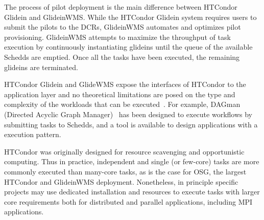 \documentclass{sig-alternate}
\begin{document}
The process of pilot deployment is the main difference between HTCondor Glidein
and GlideinWMS. While the HTCondor Glidein system requires users to submit the
pilots to the DCRs, GlideinWMS automates and optimizes pilot provisioning.
GlideinWMS attempts to maximize the throughput of task execution by continuously
instantiating glideins until the queue of the available Schedds are emptied.
Once all the tasks have been executed, the remaining glideins are terminated.


HTCondor Glidein and GlideWMS expose the interfaces of HTCondor to the
application layer and no theoretical limitations are posed on the type and
complexity of the workloads that can be executed~\cite{couvares2007workflow}.
For example, DAGman (Directed Acyclic Graph Manager)~\cite{frey2002condor} has
been designed to execute workflows by submitting tasks to Schedds, and a \MW
tool is available to design applications with a \MW execution pattern.



HTCondor was originally designed for resource scavenging and opportunistic
computing.  Thus in practice, independent and single (or few-core) tasks are
more commonly executed than many-core tasks, as is the case for OSG, the largest
HTCondor and GlideinWMS deployment. Nonetheless, in principle specific projects
may use dedicated installation and resources to execute tasks with larger core
requirements both for distributed and parallel applications, including MPI
applications.

\end{document}
